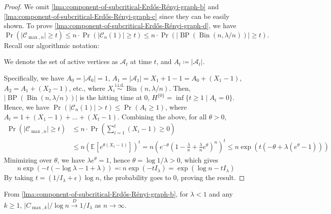 \begin{proof}
	We omit \autoref{lma:component-of-subcritical-Erdős-Rényi-graph-b} and \autoref{lma:component-of-subcritical-Erdős-Rényi-graph-c} since they can be easily shown. To prove \autoref{lma:component-of-subcritical-Erdős-Rényi-graph-d}, we have
	\[
		\Pr_{}(\lvert \mathcal{C} _{\max , n} \rvert \geq t)
		\leq n \cdot \Pr_{}(\lvert \mathcal{C} _n(1) \rvert \geq t)
		\leq n \cdot \Pr_{}(\lvert \operatorname{BP}(\operatorname{Bin}(n, \lambda / n) )  \rvert \geq t).
	\]
	Recall our algorithmic notation:

	\begin{prev}
		We denote the set of active vertices as \(\mathcal{A} _t\) at time \(t\), and \(A_t \coloneqq \lvert \mathcal{A} _t \rvert \).
	\end{prev}

	Specifically, we have \(A_0 = \lvert \mathcal{A} _0 \rvert = 1\), \(A_1 = \lvert \mathcal{A} _1 \rvert = X_1 + 1 - 1 = A_0 + (X_1 - 1)\), \(A_2 = A_1 + (X_2 - 1)\), etc., where \(X_i \overset{\text{i.i.d.} }{\sim } \operatorname{Bin}(n, \lambda / n) \). Then, \(\lvert \operatorname{BP}(\operatorname{Bin}(n, \lambda / n) )  \rvert \) is the hitting time at \(0\), \(H^{\{ 0 \} } = \inf \{ t \geq 1 \mid A_t = 0 \} \). Hence, we have \(\Pr_{}(\lvert \mathcal{C} _n(1) \rvert > t) \leq \Pr_{}(A_t \geq 1)\), where \(A_t = 1 + (X_1 - 1) + \dots  + (X_t - 1)\). Combining the above, for all \(\theta > 0\),
	\[
		\begin{split}
			\Pr_{}(\lvert \mathcal{C} _{\max , n} \rvert \geq t)
			 & \leq n \cdot \Pr_{}\left( \sum_{i=1}^{t} (X_i - 1) \geq 0 \right) \\
			 & \leq n \left( \mathbb{E}_{}[e^{\theta (X_1 - 1)}]  \right) ^t
			= n \left( e^{-\theta } \left( 1 - \frac{\lambda}{n} + \frac{\lambda}{n} e^{\theta } \right)^n \right) ^t
			\leq n \exp (t (-\theta + \lambda (e^\theta - 1)))
		\end{split}
	\]
	Minimizing over \(\theta \), we have \(\lambda e^\theta = 1\), hence \(\theta = \log 1 / \lambda > 0\), which gives
	\[
		n \exp (-t (-\log \lambda - 1 + \lambda ))
		\eqqcolon n \exp (- t I_\lambda )
		= \exp (\log n -t I_\lambda )
	\]
	By taking \(t = (1 / I_\lambda + \epsilon ) \log n\), the probability goes to \(0\), proving the result.
\end{proof}

\begin{remark}
	From \autoref{lma:component-of-subcritical-Erdős-Rényi-graph-b}, for \(\lambda < 1\) and any \(k \geq 1\), \(\lvert C_{\max , k} \rvert / \log n \overset{D}{\to} 1 / I_\lambda \) as \(n \to \infty \).
\end{remark}

